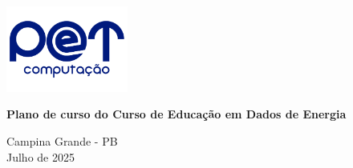 \begin{titlepage}
    \centering
    
		\includegraphics[width=0.3\textwidth]{conteudo/logo-pet.png} \par
    
    \vspace*{\fill}

    {\Huge\bfseries Plano de curso do Curso de Educação em Dados de Energia \par}
    \vspace{5cm}
    
    \vspace*{\fill}
    
    {\large Campina Grande - PB \\ Julho de 2025 \par}
\end{titlepage}

